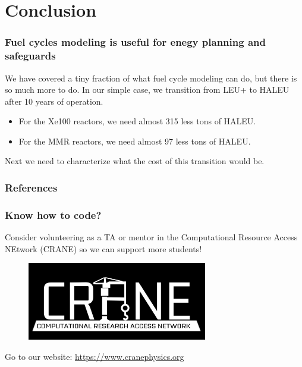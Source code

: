 \documentclass[9pt]{beamer}
\begin{document}
  \section{Conclusion}
  \begin{frame}
      \frametitle{Fuel cycles modeling is useful for enegy planning and safeguards}
      We have covered a tiny fraction of what fuel cycle modeling can do, but there is so much more to do. In our simple case, we transition from LEU+ to HALEU after 10 years of operation.
      \begin{itemize}
          \item For the Xe100 reactors, we need almost 315 less tons of HALEU.
          \item For the MMR reactors, we need almost 97 less tons of HALEU.
      \end{itemize}
      Next we need to characterize what the cost of this transition would be.
  \end{frame}






\begin{frame}[allowframebreaks]
  \frametitle{References}
  
  {\footnotesize  }

\end{frame}

\appendix

\begin{frame}
    \frametitle{Know how to code?}
    Consider volunteering as a TA or mentor in the Computational Resource Access NEtwork (CRANE) so we can support more students!
    \begin{figure}
        \centering
        \includegraphics[width=0.7\textwidth]{./images/CRANE_logo_inverted.png}
    \end{figure}
    Go to our website: \url{https://www.cranephysics.org}
\end{frame}

\end{document}
